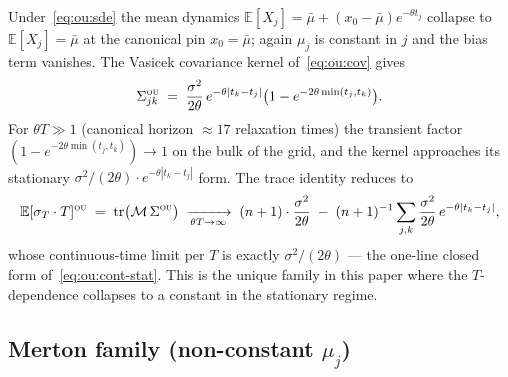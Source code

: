 \documentclass[11pt,letterpaper]{article}
\newcommand{\E}{\mathbb{E}}
\newcommand{\sigmaT}{\sigma_{T}}
\newcommand{\centerProj}{\mathcal{M}}
\begin{document}
Under~\eqref{eq:ou:sde} the mean dynamics
$\E[X_{j}] = \bar\mu + (x_{0} - \bar\mu)e^{-\theta t_{j}}$ collapse to
$\E[X_{j}] = \bar\mu$ at the canonical pin $x_{0} = \bar\mu$; again
$\mu_{j}$ is constant in $j$ and the bias term vanishes. The Vasicek
covariance kernel of~\eqref{eq:ou:cov} gives
\begin{equation}
    \Sigma_{jk}^{\textsc{ou}}
    \;=\;
    \frac{\sigma^{2}}{2\theta}\,
    e^{-\theta|t_{k} - t_{j}|}
    \bigl(1 - e^{-2\theta\min(t_{j}, t_{k})}\bigr).
    \label{eq:app:ou-Sigma}
\end{equation}
For $\theta T \gg 1$ (canonical horizon $\approx 17$ relaxation times)
the transient factor $(1 - e^{-2\theta\min(t_{j}, t_{k})}) \to 1$ on the
bulk of the grid, and the kernel approaches its stationary
$\sigma^{2}/(2\theta) \cdot e^{-\theta|t_{k} - t_{j}|}$ form. The
trace identity reduces to
\begin{equation}
    \E[\sigmaT \cdot T]^{\textsc{ou}}
    \;=\;
    \mathrm{tr}\bigl(\centerProj\,\Sigma^{\textsc{ou}}\bigr)
    \;\xrightarrow[\theta T \to \infty]{}\;
    (n+1) \cdot \frac{\sigma^{2}}{2\theta}
    \;-\; (n+1)^{-1}\sum_{j,k} \frac{\sigma^{2}}{2\theta}\,e^{-\theta|t_{k}-t_{j}|},
    \label{eq:app:ou-mean}
\end{equation}
whose continuous-time limit per $T$ is exactly
$\sigma^{2}/(2\theta)$ — the one-line closed form of~\eqref{eq:ou:cont-stat}.
This is the unique family in this paper where the
$T$-dependence collapses to a constant in the stationary regime.

\subsection{Merton family (non-constant $\mu_{j}$)}
\label{app:moments:merton}
\end{document}
